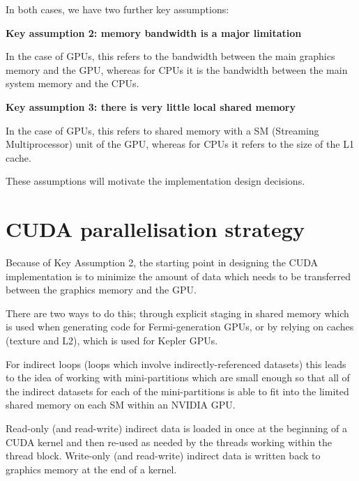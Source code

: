 \documentclass[12pt]{article}
\begin{document}
In both cases, we have two further key assumptions:

\vspace{0.1in}
{\bf Key assumption 2: memory bandwidth is a major limitation}
\vspace{0.1in}

In the case of GPUs, this refers to the bandwidth between the main
graphics memory and the GPU, whereas for CPUs it is the bandwidth between
the main system memory and the CPUs.

\vspace{0.1in}
{\bf Key assumption 3: there is very little local shared memory}
\vspace{0.1in}

In the case of GPUs, this refers to shared memory with a SM
(Streaming Multiprocessor) unit of the GPU, whereas for CPUs it
refers to the size of the L1 cache.


These assumptions will motivate the implementation design decisions.




\newpage

\section{CUDA parallelisation strategy}

Because of Key Assumption 2, the starting point in designing the
CUDA implementation is to minimize the amount of data which needs
to be transferred between the graphics memory and the GPU.

There are two ways to do this; through explicit staging in shared memory
which is used when generating code for Fermi-generation GPUs, or by
relying on caches (texture and L2), which is used for Kepler GPUs.

For indirect loops (loops which involve indirectly-referenced datasets)
this leads to the idea of working with mini-partitions which are small
enough so that all of the indirect datasets for each of the mini-partitions
is able to fit into the limited shared memory on each SM within an NVIDIA
GPU.

Read-only (and read-write) indirect data is loaded in once at the beginning
of a CUDA kernel and then re-used as needed by the threads working within
the thread block.  Write-only (and read-write) indirect data is written
back to graphics memory at the end of a kernel.
\end{document}
